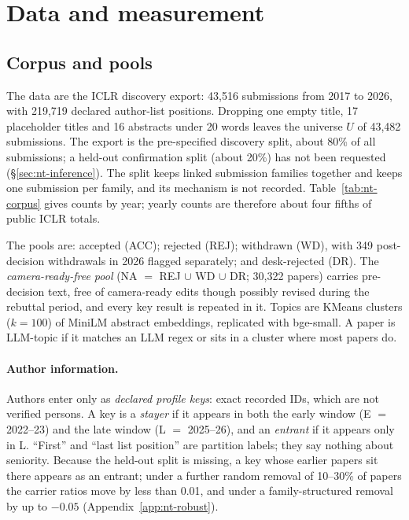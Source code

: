 \section{Data and measurement}
\label{sec:nt-data}

\subsection{Corpus and pools}
\label{sec:nt-corpus}
The data are the ICLR discovery export: 43,516 submissions from 2017 to 2026, with 219,719 declared author-list positions. Dropping one empty title, 17 placeholder titles and 16 abstracts under 20 words leaves the universe $U$ of 43,482 submissions. %
The export is the pre-specified discovery split, about 80\% of all submissions; a held-out confirmation split (about 20\%) has not been requested (\S\ref{sec:nt-inference}). The split keeps linked submission families together and keeps one submission per family, and its mechanism is not recorded. Table~\ref{tab:nt-corpus} gives counts by year; yearly counts are therefore about four fifths of public ICLR totals.

The pools are: accepted (ACC); rejected (REJ); withdrawn (WD), with 349 post-decision withdrawals in 2026 flagged separately; and desk-rejected (DR). The \emph{camera-ready-free pool} (NA $=$ REJ $\cup$ WD $\cup$ DR; 30,322 papers) carries pre-decision text, free of camera-ready edits though possibly revised during the rebuttal period, and every key result is repeated in it. Topics are KMeans clusters ($k=100$) of MiniLM abstract embeddings, replicated with bge-small. A paper is LLM-topic if it matches an LLM regex or sits in a cluster where most papers do.

\paragraph{Author information.} Authors enter only as \emph{declared profile keys}: exact recorded IDs, which are not verified persons. A key is a \emph{stayer} if it appears in both the early window (E $=$ 2022--23) and the late window (L $=$ 2025--26), and an \emph{entrant} if it appears only in L. ``First'' and ``last list position'' are partition labels; they say nothing about seniority. Because the held-out split is missing, a key whose earlier papers sit there appears as an entrant; under a further random removal of 10--30\% of papers the carrier ratios move by less than 0.01, and under a family-structured removal by up to $-0.05$ (Appendix~\ref{app:nt-robust}).

